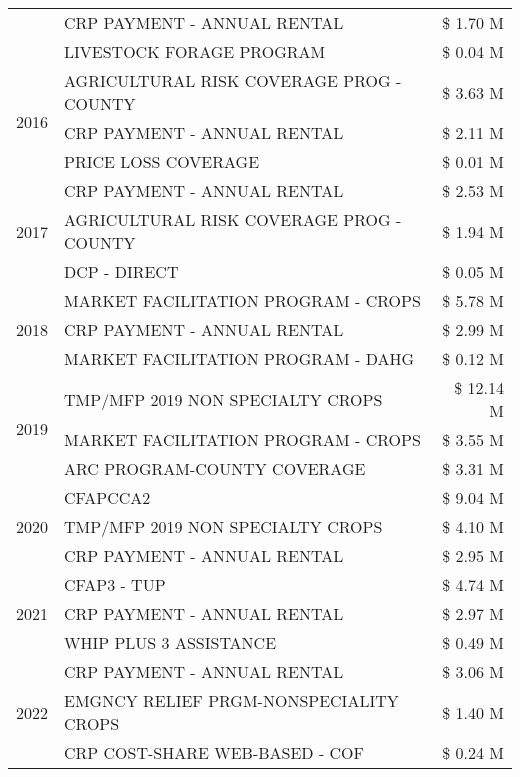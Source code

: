 \begin{tabular}{llr}
 & CRP PAYMENT - ANNUAL RENTAL & \$ 1.70 M \\
 & LIVESTOCK FORAGE PROGRAM & \$ 0.04 M \\
\cline{1-3}
\multirow[t]{3}{*}{2016} & AGRICULTURAL RISK COVERAGE PROG - COUNTY & \$ 3.63 M \\
 & CRP PAYMENT - ANNUAL RENTAL & \$ 2.11 M \\
 & PRICE LOSS COVERAGE & \$ 0.01 M \\
\cline{1-3}
\multirow[t]{3}{*}{2017} & CRP PAYMENT - ANNUAL RENTAL & \$ 2.53 M \\
 & AGRICULTURAL RISK COVERAGE PROG - COUNTY & \$ 1.94 M \\
 & DCP - DIRECT & \$ 0.05 M \\
\cline{1-3}
\multirow[t]{3}{*}{2018} & MARKET FACILITATION PROGRAM - CROPS & \$ 5.78 M \\
 & CRP PAYMENT - ANNUAL RENTAL & \$ 2.99 M \\
 & MARKET FACILITATION PROGRAM - DAHG & \$ 0.12 M \\
\cline{1-3}
\multirow[t]{3}{*}{2019} & TMP/MFP 2019 NON SPECIALTY CROPS & \$ 12.14 M \\
 & MARKET FACILITATION PROGRAM - CROPS & \$ 3.55 M \\
 & ARC PROGRAM-COUNTY COVERAGE & \$ 3.31 M \\
\cline{1-3}
\multirow[t]{3}{*}{2020} & CFAPCCA2 & \$ 9.04 M \\
 & TMP/MFP 2019 NON SPECIALTY CROPS & \$ 4.10 M \\
 & CRP PAYMENT - ANNUAL RENTAL & \$ 2.95 M \\
\cline{1-3}
\multirow[t]{3}{*}{2021} & CFAP3 - TUP & \$ 4.74 M \\
 & CRP PAYMENT - ANNUAL RENTAL & \$ 2.97 M \\
 & WHIP PLUS 3 ASSISTANCE & \$ 0.49 M \\
\cline{1-3}
\multirow[t]{3}{*}{2022} & CRP PAYMENT - ANNUAL RENTAL & \$ 3.06 M \\
 & EMGNCY RELIEF PRGM-NONSPECIALITY CROPS & \$ 1.40 M \\
 & CRP COST-SHARE WEB-BASED - COF & \$ 0.24 M \\
\cline{1-3}
\bottomrule
\end{tabular}
